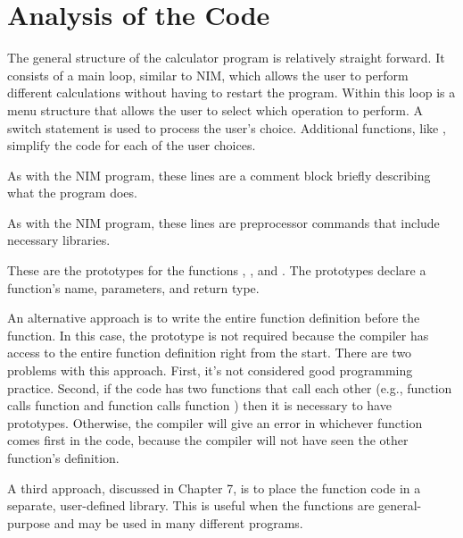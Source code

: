 
\section{Analysis of the Code}

The general structure of the calculator program is relatively straight forward.  It consists of a main loop, similar to NIM, which allows the user to perform different calculations without having to restart the program.  Within this loop is a menu structure that allows the user to select which operation to perform.  A switch statement is used to process the user's choice.  Additional functions, like , simplify the code for each of the user choices.

As with the NIM program, these lines are a comment block briefly describing what the program does.

As with the NIM program, these lines are preprocessor commands that include necessary libraries.


These are the prototypes for the functions , , and .  The prototypes declare a function's name, parameters, and return type. 

An alternative approach is to write the entire function definition before the  function.  In this case, the prototype is not required because the compiler has access to the entire function definition right from the start.  There are two problems with this approach.  First, it's not considered good programming practice.  Second, if the code has two functions that call each other (e.g., function  calls function  and function  calls function ) then it is necessary to have prototypes.  Otherwise, the compiler will give an error in whichever function comes first in the code, because the compiler will not have seen the other function's definition.

A third approach, discussed in Chapter 7, is to place the function code in a separate, user-defined library.  This is useful when the functions are general-purpose and may be used in many different programs. 


